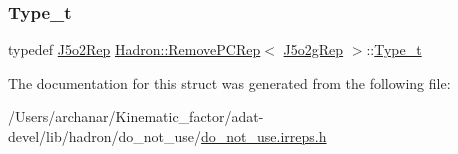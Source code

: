 \mbox{\label{structHadron_1_1RemovePCRep_3_01J5o2gRep_01_4_a2c403d167c34bc5b00820e498b1d6fd3}} 
\subsubsection{\texorpdfstring{Type\_t}{Type\_t}\hspace{0.1cm}{\footnotesize\ttfamily [2/2]}}
{\footnotesize\ttfamily typedef \mbox{\hyperlink{structHadron_1_1J5o2Rep}{J5o2\+Rep}} \mbox{\hyperlink{structHadron_1_1RemovePCRep}{Hadron\+::\+Remove\+P\+C\+Rep}}$<$ \mbox{\hyperlink{structHadron_1_1J5o2gRep}{J5o2g\+Rep}} $>$\+::\mbox{\hyperlink{structHadron_1_1RemovePCRep_3_01J5o2gRep_01_4_a2c403d167c34bc5b00820e498b1d6fd3}{Type\+\_\+t}}}



The documentation for this struct was generated from the following file\+:\begin{DoxyCompactItemize}
\item 
/\+Users/archanar/\+Kinematic\+\_\+factor/adat-\/devel/lib/hadron/do\+\_\+not\+\_\+use/\mbox{\hyperlink{adat-devel_2lib_2hadron_2do__not__use_2do__not__use_8irreps_8h}{do\+\_\+not\+\_\+use.\+irreps.\+h}}\end{DoxyCompactItemize}
